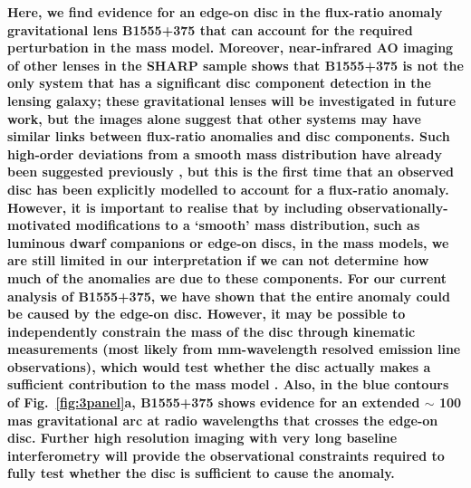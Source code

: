 \documentclass[a4paper,fleqn,usenatbib,useAMS]{mnras}
\begin{document}
\textbf{ 
Here, we find evidence for an edge-on disc in the flux-ratio anomaly
gravitational lens B1555+375 that can account for the required
perturbation in the mass model.  Moreover, near-infrared AO imaging of
other lenses in the SHARP sample shows that B1555+375 is not the only
system that has a significant disc component detection in the lensing
galaxy; these gravitational lenses will be investigated in future
work, but the images alone suggest that other systems may have similar
links between flux-ratio anomalies and disc components. Such
high-order deviations from a smooth mass distribution have already
been suggested previously \citep{evans03, congdon05}, but this is the
first time that an observed disc has been explicitly modelled to
account for a flux-ratio anomaly. However, it is important to realise
that by including observationally-motivated modifications to a
`smooth' mass distribution, such as luminous dwarf companions or
edge-on discs, in the mass models, we are still limited in our
interpretation if we can not determine how much of the anomalies are
due to these components. For our current analysis of B1555+375, we
have shown that the entire anomaly could be caused by the edge-on
disc.  However, it may be possible to independently constrain the mass
of the disc through kinematic measurements (most likely from
mm-wavelength resolved emission line observations), which would test
whether the disc actually makes a sufficient contribution to the mass
model \citep[e.g. as in the case of B1933+503;][]{suyu12}. Also, in
the blue contours of Fig.~\ref{fig:3panel}a, B1555+375 shows evidence
for an extended $\sim$ 100 mas gravitational arc at radio wavelengths
that crosses the edge-on disc. Further high resolution imaging with
very long baseline interferometry will provide the observational
constraints required to fully test whether the disc is sufficient to
cause the anomaly.}
\end{document}
